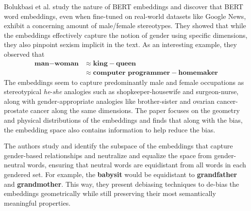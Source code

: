 \documentclass[10pt,twocolumn,letterpaper]{article}
\begin{document}
Bolukbasi et al. \cite{biased-bert-embeddings} study the nature of BERT embeddings and discover that BERT word embeddings, even when fine-tuned on real-world datasets like Google News, exhibit a concerning amount of male/female stereotypes.
They showed that while the embeddings effectively capture the notion of gender using specific dimensions, they also pinpoint sexism implicit in the text.
As an interesting example, they observed that
\begin{align*}
    \textbf{man} - \textbf{woman} &\approx \textbf{king} - \textbf{queen} \\
    &\approx \textbf{computer programmer} - \textbf{homemaker}
\end{align*}
The embeddings seem to capture predominantly male and female occupations as stereotypical \textit{he}-\textit{she} analogies such as shopkeeper-housewife and surgeon-nurse, along with gender-appropriate analogies like brother-sister and ovarian cancer-prostate cancer along the same dimensions.
The paper focuses on the geometry and physical distributions of the embeddings and finds that along with the bias, the embedding space also contains information to help reduce the bias.

The authors study and identify the subspace of the embeddings that capture gender-based relationships and neutralize and equalize the space from gender-neutral words, ensuring that neutral words are equidistant from all words in each gendered set.
For example, the \textbf{babysit} would be equidistant to \textbf{grandfather} and \textbf{grandmother}.
This way, they present debiasing techniques to de-bias the embeddings geometrically while still preserving their most semantically meaningful properties.
\end{document}
